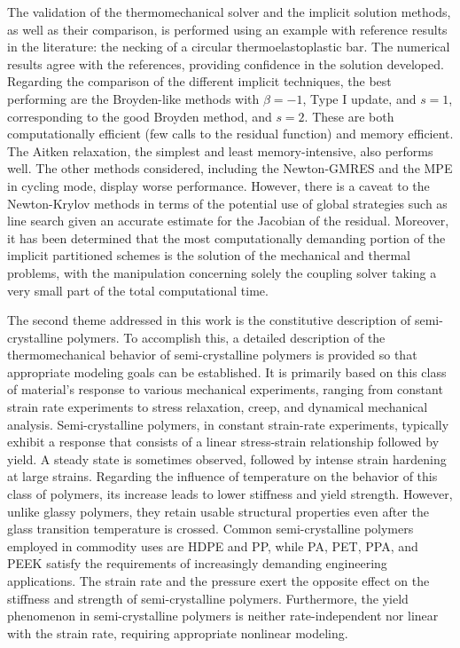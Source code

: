 The validation of the thermomechanical solver and the implicit solution methods, as well as their comparison, is performed using an example with reference results in the literature: the necking of a circular thermoelastoplastic bar.
The numerical results agree with the references, providing confidence in the solution developed.
Regarding the comparison of the different implicit techniques, the best performing are the Broyden-like methods with \(\beta=-1\), Type I update, and \(s=1\), corresponding to the good Broyden method, and \(s=2\).
These are both computationally efficient (few calls to the residual function) and memory efficient.
The Aitken relaxation, the simplest and least memory-intensive, also performs well.
The other methods considered, including the Newton-GMRES and the MPE in cycling mode, display worse performance.
However, there is a caveat to the Newton-Krylov methods in terms of the potential use of global strategies such as line search given an accurate estimate for the Jacobian of the residual.
Moreover, it has been determined that the most computationally demanding portion of the implicit partitioned schemes is the solution of the mechanical and thermal problems, with the manipulation concerning solely the coupling solver taking a very small part of the total computational time.

The second theme addressed in this work is the constitutive description of semi-crystalline polymers.
To accomplish this, a detailed description of the thermomechanical behavior of semi-crystalline polymers is provided so that appropriate modeling goals can be established.
It is primarily based on this class of material's response to various mechanical experiments, ranging from constant strain rate experiments to stress relaxation, creep, and dynamical mechanical analysis.
Semi-crystalline polymers, in constant strain-rate experiments, typically exhibit a response that consists of a linear stress-strain relationship followed by yield.
A steady state is sometimes observed, followed by intense strain hardening at large strains.
Regarding the influence of temperature on the behavior of this class of polymers, its increase leads to lower stiffness and yield strength.
However, unlike glassy polymers, they retain usable structural properties even after the glass transition temperature is crossed.
Common semi-crystalline polymers employed in commodity uses are HDPE and PP, while PA, PET, PPA, and PEEK satisfy the requirements of increasingly demanding engineering applications.
The strain rate and the pressure exert the opposite effect on the stiffness and strength of semi-crystalline polymers.
Furthermore, the yield phenomenon in semi-crystalline polymers is neither rate-independent nor linear with the strain rate, requiring appropriate nonlinear modeling.


